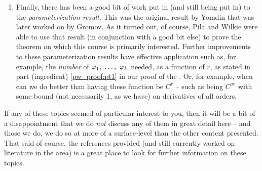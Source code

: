 \begin{remark}
\begin{enumerate}
    \item Finally, there has been a good bit of work put in (and still being put in) to the \emph{parameterization result}. This was the original result by Yomdin that was later worked on by Gromov. As it turned out, of course, Pila and Wilkie were able to use that result (in conjunction with a good bit else) to prove the theorem on which this course is primarily interested. Further improvements to these parameterization results have effective application such as, for example, the \emph{number} of $\varphi_1, \ \hdots, \ \varphi_{k}$ needed, as a function of $r$, as stated in part (ingredient) \ref{pw_proof:pt1} in our proof of the \pwt. Or, for example, when can we do better than having these function be $C^r$ -- such as being $C^{\infty}$ with some bound (not necessarily 1, as we have) on derivatives of all orders.
  \end{enumerate}
\end{remark}

If any of these topics seemed of particular interest to you, then it will be a bit of a disappointment that we do  \emph{not} discuss any of them in great detail here -- and those we do, we do so at more of a surface-level than the other content presented. That said of course, the references provided (and still currently worked on literature in the area) is a great place to look for further information on these topics.
